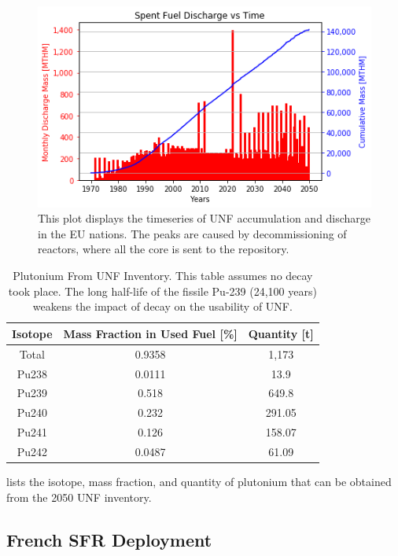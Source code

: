 \begin{figure}[htbp!]
	\begin{center}
			\includegraphics[scale=0.7]{./images/eu_future/snf_discharge.png}
	\end{center}
	\caption{This plot displays the timeseries of \gls{UNF} accumulation and discharge in the \gls{EU} nations.
			 The peaks are caused by decommissioning of reactors, where all the core is sent to the repository.}
	\label{fig:eu_snf}
\end{figure}
\FloatBarrier


\begin{table}[h]
	\centering
	\begin{tabular}{ccc}
		\hline
		\textbf{Isotope} & \textbf{Mass Fraction in Used Fuel [\%]} & \textbf{Quantity [t]} \\ \hline
		Total & 0.9358 & 1,173 \\ \hline
		Pu238 & 0.0111 & 13.9 \\ 
		Pu239 & 0.518 & 649.8 \\ 
		Pu240 & 0.232 & 291.05 \\ 
		Pu241 & 0.126 & 158.07 \\ 
		Pu242 & 0.0487 & 61.09 \\ \hline
	\end{tabular}
	\caption{Plutonium From \gls{UNF} Inventory. This table assumes no decay
			 took place. The long half-life of the fissile Pu-239 (24,100 years)
			 weakens the impact of decay on the usability of \gls{UNF}.}
	\label{tab:pu}
\end{table}


 lists the isotope, mass fraction,
and quantity of plutonium that can be obtained from the 2050 \gls{UNF} inventory.


\subsection{French SFR Deployment}

